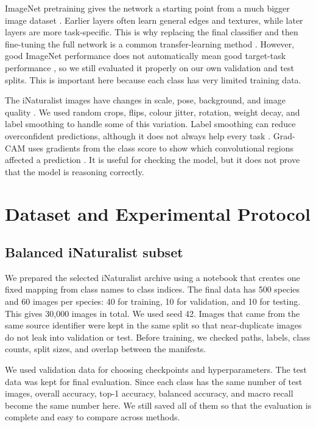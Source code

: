 \documentclass[10pt,twocolumn,letterpaper]{article}
\begin{document}
ImageNet pretraining gives the network a starting point from a much bigger image dataset \cite{deng2009imagenet}.  Earlier layers often learn general edges and textures, while later layers are more task-specific.  This is why replacing the final classifier and then fine-tuning the full network is a common transfer-learning method \cite{yosinski2014transferable}.  However, good ImageNet performance does not automatically mean good target-task performance \cite{kornblith2019better}, so we still evaluated it properly on our own validation and test splits.  This is important here because each class has very limited training data.

The iNaturalist images have changes in scale, pose, background, and image quality \cite{vanhorn2021benchmarking}.  We used random crops, flips, colour jitter, rotation, weight decay, and label smoothing to handle some of this variation.  Label smoothing can reduce overconfident predictions, although it does not always help every task \cite{muller2019label}.  Grad-CAM uses gradients from the class score to show which convolutional regions affected a prediction \cite{selvaraju2017grad}.  It is useful for checking the model, but it does not prove that the model is reasoning correctly.

\section{Dataset and Experimental Protocol}
\subsection{Balanced iNaturalist subset}
We prepared the selected iNaturalist archive using a notebook that creates one fixed mapping from class names to class indices.  The final data has 500 species and 60 images per species: 40 for training, 10 for validation, and 10 for testing.  This gives 30,000 images in total.  We used seed 42.  Images that came from the same source identifier were kept in the same split so that near-duplicate images do not leak into validation or test.  Before training, we checked paths, labels, class counts, split sizes, and overlap between the manifests.

We used validation data for choosing checkpoints and hyperparameters.  The test data was kept for final evaluation.  Since each class has the same number of test images, overall accuracy, top-1 accuracy, balanced accuracy, and macro recall become the same number here.  We still saved all of them so that the evaluation is complete and easy to compare across methods.
\end{document}
